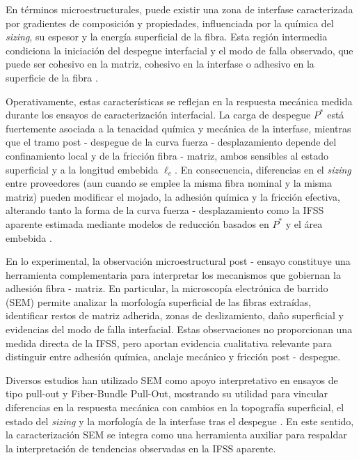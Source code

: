En términos microestructurales, puede existir una zona de interfase caracterizada por gradientes
de composición y propiedades, influenciada por la química del \textit{sizing}, su espesor y la
energía superficial de la fibra. Esta región intermedia condiciona la iniciación del despegue
interfacial y el modo de falla observado, que puede ser cohesivo en la matriz, cohesivo en la
interfase o adhesivo en la superficie de la fibra
\cite{AhmadvashAghbash2024IMR, Liu2021}.

Operativamente, estas características se reflejan en la respuesta mecánica medida durante los
ensayos de caracterización interfacial. La carga de despegue \(P^{\ast}\) está fuertemente asociada
a la tenacidad química y mecánica de la interfase, mientras que el tramo post - despegue de la
curva fuerza - desplazamiento depende del confinamiento local y de la fricción fibra - matriz,
ambos sensibles al estado superficial y a la longitud embebida \(\ell_e\). En consecuencia,
diferencias en el \textit{sizing} entre proveedores (aun cuando se emplee la misma fibra nominal
y la misma matriz) pueden modificar el mojado, la adhesión química y la fricción efectiva,
alterando tanto la forma de la curva fuerza - desplazamiento como la IFSS aparente estimada
mediante modelos de reducción basados en \(P^{\ast}\) y el área embebida
\cite{Liu2021, AhmadvashAghbash2024IMR}.

En lo experimental, la observación microestructural post - ensayo constituye una
herramienta complementaria para interpretar los mecanismos que gobiernan la adhesión fibra - matriz.
En particular, la microscopía electrónica de barrido (SEM) permite analizar la morfología superficial
de las fibras extraídas, identificar restos de matriz adherida, zonas de deslizamiento, daño
superficial y evidencias del modo de falla interfacial. Estas observaciones no proporcionan una medida
directa de la IFSS, pero aportan evidencia cualitativa relevante para distinguir entre adhesión
química, anclaje mecánico y fricción post - despegue.

Diversos estudios han utilizado SEM como apoyo interpretativo en ensayos de tipo pull-out y
Fiber-Bundle Pull-Out, mostrando su utilidad para vincular diferencias en la respuesta mecánica con
cambios en la topografía superficial, el estado del \textit{sizing} y la morfología de la interfase
tras el despegue \cite{DeLeon2022, Liu2021}. En este sentido, la caracterización SEM se integra como
una herramienta auxiliar para respaldar la interpretación de tendencias observadas en la IFSS
aparente.

